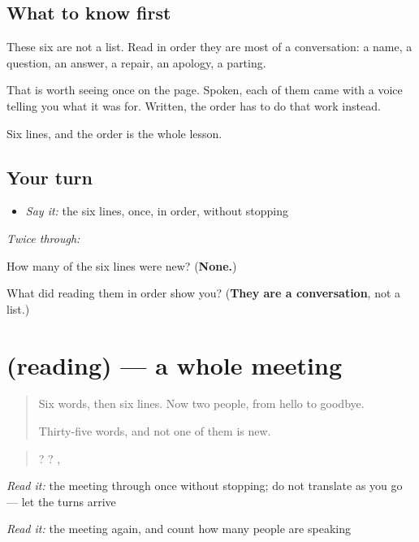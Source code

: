\subsection*{What to know first}
These six are not a list. Read in order they are most of a conversation: a name, a question, an answer, a repair, an apology, a parting.

That is worth seeing once on the page. Spoken, each of them came with a voice telling you what it was for. Written, the order has to do that work instead.

Six lines, and the order is the whole lesson.

\subsection*{Your turn}
\begin{itemize}
\raggedright
  \item \emph{Say it:} the six lines, once, in order, without stopping
\end{itemize}

\emph{Twice through:}

\begin{tcolorbox}[breakable,colback=teal!4,colframe=teal!35!black,title={Before you move on}]
How many of the six lines were new? (\textbf{None.})

What did reading them in order show you? (\textbf{They are a conversation}, not a list.)
\end{tcolorbox}
\section[(reading)]{(reading) — a whole meeting}

\label{lesson:GU-C44-pehli-vanchan}



\begin{quote}
Six words, then six lines. Now two people, from hello to goodbye.

Thirty-five words, and not one of them is new.
\end{quote}

\begin{tcolorbox}[breakable,skin=enhanced,colback=orange!6,colframe=orange!45!black,boxrule=0.5pt,arc=1mm,left=6pt,right=6pt,top=4pt,bottom=4pt,fonttitle=\bfseries,title={Read this}]
\begin{quote}
  ?       ?                  ,       
\end{quote}

\emph{Read it:} the meeting through once without stopping; do not translate as you go — let the turns arrive

\emph{Read it:} the meeting again, and count how many people are speaking
\end{tcolorbox}

